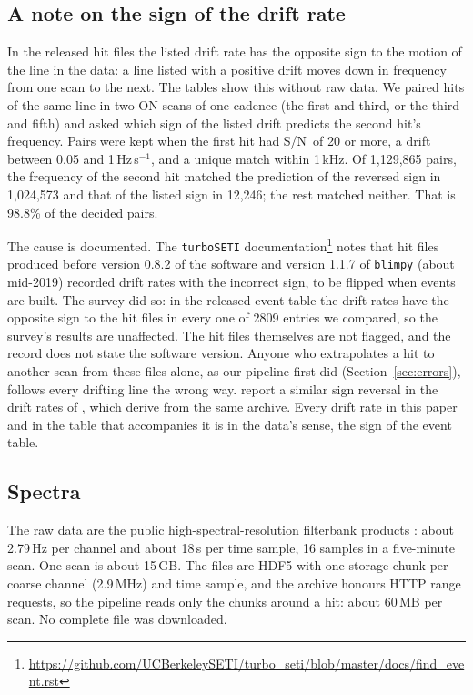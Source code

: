 \documentclass[twocolumn]{aastex631}
\newcommand{\hzs}{Hz\,s$^{-1}$}
\newcommand{\sn}{S/N}
\begin{document}
\subsection{A note on the sign of the drift rate} \label{sec:sign}

In the released hit files the listed drift rate has the opposite sign to
the motion of the line in the data: a line listed with a positive drift
moves down in frequency from one scan to the next. The tables show this
without raw data. We paired hits of the same line in two ON scans of one
cadence (the first and third, or the third and fifth) and asked which sign
of the listed drift predicts the second hit's frequency. Pairs were kept
when the first hit had \sn\ of 20 or more, a drift between 0.05 and
1\,\hzs, and a unique match within 1\,kHz. Of 1,129,865 pairs, the frequency
of the second hit matched the prediction of the reversed sign in 1,024,573
and that of the listed sign in 12,246; the rest matched neither. That is
98.8\% of the decided pairs.

The cause is documented. The \texttt{turboSETI}
documentation\footnote{\url{https://github.com/UCBerkeleySETI/turbo_seti/blob/master/docs/find_event.rst}}
notes that hit files produced before version 0.8.2 of the software and
version 1.1.7 of \texttt{blimpy} (about mid-2019) recorded drift rates with
the incorrect sign, to be flipped when events are built. The survey did so:
in the released event table the drift rates have the opposite sign to the
hit files in every one of 2809 entries we compared, so the survey's results
are unaffected. The hit files themselves are not flagged, and the record
does not state the software version. Anyone who extrapolates a hit to
another scan from these files alone, as our pipeline first did
(Section~\ref{sec:errors}), follows every drifting line the wrong way.
\citet{Margot2023} report a similar sign reversal in the drift rates of
\citet{Ma2023}, which derive from the same archive. Every drift rate in this
paper and in the table that accompanies it is in the data's sense, the
sign of the event table.

\subsection{Spectra}

The raw data are the public high-spectral-resolution filterbank products
\citep{Lebofsky2019}: about 2.79\,Hz per channel and about 18\,s per time
sample, 16 samples in a five-minute scan. One scan is about 15\,GB. The
files are HDF5 with one storage chunk per coarse channel (2.9\,MHz) and time
sample, and the archive honours HTTP range requests, so the pipeline reads
only the chunks around a hit: about 60\,MB per scan. No complete file was
downloaded.
\end{document}

